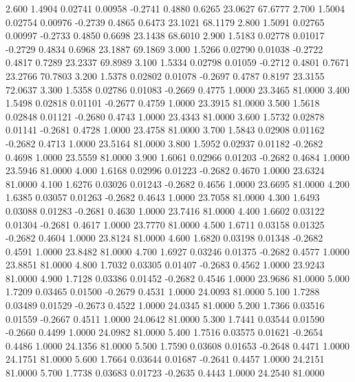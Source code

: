    2.600   1.4904   0.02741   0.00958  -0.2741   0.4880   0.6265  23.0627  67.6777
   2.700   1.5004   0.02754   0.00976  -0.2739   0.4865   0.6473  23.1021  68.1179
   2.800   1.5091   0.02765   0.00997  -0.2733   0.4850   0.6698  23.1438  68.6010
   2.900   1.5183   0.02778   0.01017  -0.2729   0.4834   0.6968  23.1887  69.1869
   3.000   1.5266   0.02790   0.01038  -0.2722   0.4817   0.7289  23.2337  69.8989
   3.100   1.5334   0.02798   0.01059  -0.2712   0.4801   0.7671  23.2766  70.7803
   3.200   1.5378   0.02802   0.01078  -0.2697   0.4787   0.8197  23.3155  72.0637
   3.300   1.5358   0.02786   0.01083  -0.2669   0.4775   1.0000  23.3465  81.0000
   3.400   1.5498   0.02818   0.01101  -0.2677   0.4759   1.0000  23.3915  81.0000
   3.500   1.5618   0.02848   0.01121  -0.2680   0.4743   1.0000  23.4343  81.0000
   3.600   1.5732   0.02878   0.01141  -0.2681   0.4728   1.0000  23.4758  81.0000
   3.700   1.5843   0.02908   0.01162  -0.2682   0.4713   1.0000  23.5164  81.0000
   3.800   1.5952   0.02937   0.01182  -0.2682   0.4698   1.0000  23.5559  81.0000
   3.900   1.6061   0.02966   0.01203  -0.2682   0.4684   1.0000  23.5946  81.0000
   4.000   1.6168   0.02996   0.01223  -0.2682   0.4670   1.0000  23.6324  81.0000
   4.100   1.6276   0.03026   0.01243  -0.2682   0.4656   1.0000  23.6695  81.0000
   4.200   1.6385   0.03057   0.01263  -0.2682   0.4643   1.0000  23.7058  81.0000
   4.300   1.6493   0.03088   0.01283  -0.2681   0.4630   1.0000  23.7416  81.0000
   4.400   1.6602   0.03122   0.01304  -0.2681   0.4617   1.0000  23.7770  81.0000
   4.500   1.6711   0.03158   0.01325  -0.2682   0.4604   1.0000  23.8124  81.0000
   4.600   1.6820   0.03198   0.01348  -0.2682   0.4591   1.0000  23.8482  81.0000
   4.700   1.6927   0.03246   0.01375  -0.2682   0.4577   1.0000  23.8851  81.0000
   4.800   1.7032   0.03305   0.01407  -0.2683   0.4562   1.0000  23.9243  81.0000
   4.900   1.7128   0.03386   0.01452  -0.2682   0.4546   1.0000  23.9686  81.0000
   5.000   1.7209   0.03465   0.01500  -0.2679   0.4531   1.0000  24.0093  81.0000
   5.100   1.7288   0.03489   0.01529  -0.2673   0.4522   1.0000  24.0345  81.0000
   5.200   1.7366   0.03516   0.01559  -0.2667   0.4511   1.0000  24.0642  81.0000
   5.300   1.7441   0.03544   0.01590  -0.2660   0.4499   1.0000  24.0982  81.0000
   5.400   1.7516   0.03575   0.01621  -0.2654   0.4486   1.0000  24.1356  81.0000
   5.500   1.7590   0.03608   0.01653  -0.2648   0.4471   1.0000  24.1751  81.0000
   5.600   1.7664   0.03644   0.01687  -0.2641   0.4457   1.0000  24.2151  81.0000
   5.700   1.7738   0.03683   0.01723  -0.2635   0.4443   1.0000  24.2540  81.0000
